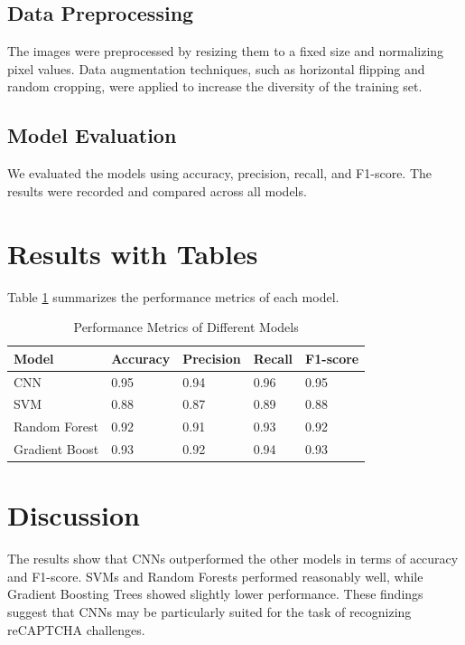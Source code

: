 \documentclass{article}
\begin{document}
\subsection{Data Preprocessing}
The images were preprocessed by resizing them to a fixed size and normalizing pixel values. Data augmentation techniques, such as horizontal flipping and random cropping, were applied to increase the diversity of the training set.

\subsection{Model Evaluation}
We evaluated the models using accuracy, precision, recall, and F1-score. The results were recorded and compared across all models.

\section{Results with Tables}
Table \ref{tab:results} summarizes the performance metrics of each model.

\begin{table}[htbp]
\centering
\caption{Performance Metrics of Different Models}
\label{tab:results}
\begin{tabular}{@{}lllll@{}}
\toprule
\textbf{Model} & \textbf{Accuracy} & \textbf{Precision} & \textbf{Recall} & \textbf{F1-score} \\ \midrule
CNN            & 0.95              & 0.94              & 0.96            & 0.95              \\
SVM            & 0.88              & 0.87              & 0.89            & 0.88              \\
Random Forest  & 0.92              & 0.91              & 0.93            & 0.92              \\
Gradient Boost & 0.93              & 0.92              & 0.94            & 0.93              \\ \bottomrule
\end{tabular}
\end{table}

\section{Discussion}
The results show that CNNs outperformed the other models in terms of accuracy and F1-score. SVMs and Random Forests performed reasonably well, while Gradient Boosting Trees showed slightly lower performance. These findings suggest that CNNs may be particularly suited for the task of recognizing reCAPTCHA challenges.
\end{document}
